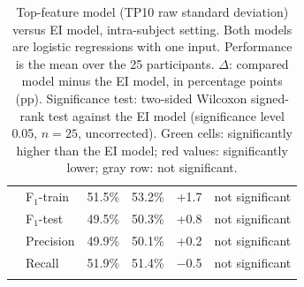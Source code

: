 \begin{table}[H]
\begin{tabularx}{\textwidth}{c l >{\centering\arraybackslash}p{2.5cm} >{\centering\arraybackslash}X >{\centering\arraybackslash}p{1.5cm}|>{\centering\arraybackslash}p{2.95cm}}
\arrayrulecolor{black}\hline
\cellcolor{classBox} & \textcolor{nsGray}{F\(_1\)-train} & \textcolor{nsGray}{51.5\%} & \textcolor{nsGray}{53.2\%} & \textcolor{nsGray}{+1.7} & {\footnotesize\textcolor{nsGray}{not significant}} \\
\arrayrulecolor{ruleGray}\cline{2-6}
\cellcolor{classBox} & \textcolor{nsGray}{F\(_1\)-test} & \textcolor{nsGray}{49.5\%} & \textcolor{nsGray}{50.3\%} & \textcolor{nsGray}{+0.8} & {\footnotesize\textcolor{nsGray}{not significant}} \\
\arrayrulecolor{ruleGray}\cline{2-6}
\cellcolor{classBox} & \textcolor{nsGray}{Precision} & \textcolor{nsGray}{49.9\%} & \textcolor{nsGray}{50.1\%} & \textcolor{nsGray}{+0.2} & {\footnotesize\textcolor{nsGray}{not significant}} \\
\arrayrulecolor{ruleGray}\cline{2-6}
\cellcolor{classBox}\multirow{-4}{*}{\rotatebox[origin=c]{90}{\texttt{SKIP}}} & \textcolor{nsGray}{Recall} & \textcolor{nsGray}{51.9\%} & \textcolor{nsGray}{51.4\%} & \textcolor{nsGray}{\(-\)0.5} & {\footnotesize\textcolor{nsGray}{not significant}} \\
\arrayrulecolor{black}\hline
\end{tabularx}
\caption{Top-feature model (TP10 raw standard deviation) versus EI model, intra-subject setting. Both models are logistic regressions with one input. Performance is the mean over the 25 participants. \(\Delta\): compared model minus the EI model, in percentage points (pp). Significance test: two-sided Wilcoxon signed-rank test against the EI model (significance level 0.05, $n=25$, uncorrected). Green cells: significantly higher than the EI model; red values: significantly lower; gray row: not significant.}
\label{tab:metrics_5_intra_3}
\end{table}